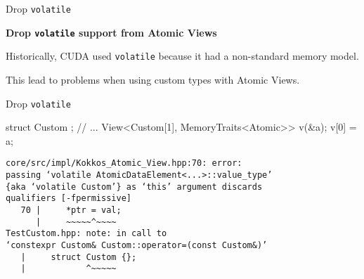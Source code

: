 
%
%
%
%

\begin{frame}[fragile]{Drop \texttt{volatile}}

\textbf{Drop \texttt{volatile} support from Atomic Views}

\vspace{20pt}

Historically, CUDA used \texttt{volatile} because it had a non-standard memory model.

This lead to problems when using custom types with Atomic Views.

\end{frame}


\begin{frame}[fragile]{Drop \texttt{volatile}}

\begin{code}

struct Custom {};
// ...
View<Custom[1], MemoryTraits<Atomic>> v(&a);
v[0] = a;

\end{code}

\begin{verbatim}
core/src/impl/Kokkos_Atomic_View.hpp:70: error:
passing ‘volatile AtomicDataElement<...>::value_type’ 
{aka ‘volatile Custom’} as ‘this’ argument discards
qualifiers [-fpermissive]
   70 |     *ptr = val;
      |     ~~~~~^~~~~
TestCustom.hpp: note: in call to
‘constexpr Custom& Custom::operator=(const Custom&)’
   |     struct Custom {};
   |            ^~~~~~
\end{verbatim}

\end{frame}


